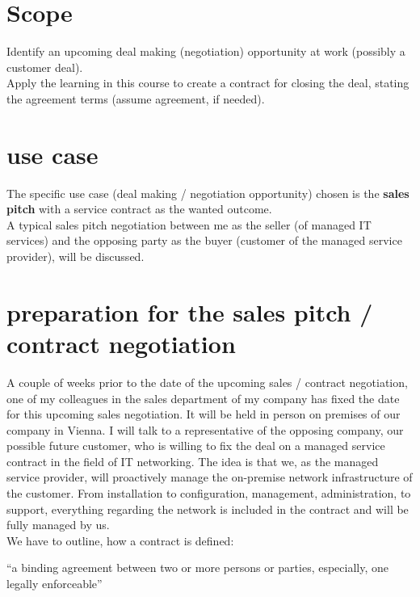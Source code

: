 \chapter{Scope}

Identify an upcoming deal making (negotiation) opportunity at work (possibly a customer deal). \\

\noindent Apply the learning in this course to create a contract for closing the deal, stating the agreement terms (assume agreement, if needed).

\chapter{use case}

The specific use case (deal making / negotiation opportunity) chosen is the \textbf{sales pitch}
with a service contract as the wanted outcome. \\

\noindent A typical sales pitch negotiation between me as the seller (of managed IT services) and 
the opposing party as the buyer (customer of the managed service provider), will be discussed. \\
 
\chapter{preparation for the sales pitch / contract negotiation}

A couple of weeks prior to the date of the upcoming sales / contract negotiation,
one of my colleagues in the sales department of my company has fixed the date
for this upcoming sales negotiation. It will be held in person on premises of
our company in Vienna. I will talk to a representative of the opposing company,
our possible future customer, who is willing to fix the deal on a 
managed service contract in the field of IT networking. The idea is that
we, as the managed service provider, will proactively manage the on-premise
network infrastructure of the customer. From installation to configuration,
management, administration, to support, everything regarding the network
is included in the contract and will be fully managed by us. \\

\noindent We have to outline, how a contract is defined:

\begin{center}
	\enquote{a binding agreement between two or more persons or parties, especially, one legally enforceable} \autocite{merriamWebsterDefinitionContract}
\end{center}

